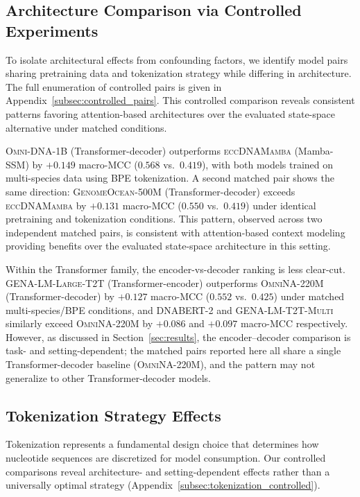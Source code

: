 \documentclass{llmxive}
\begin{document}

\subsection{Architecture Comparison via Controlled Experiments}
\label{subsec:architecture}

To isolate architectural effects from confounding factors, we identify
model pairs sharing pretraining data and tokenization strategy while
differing in architecture. The full enumeration of controlled pairs
is given in Appendix~\ref{subsec:controlled_pairs}. This controlled
comparison reveals consistent patterns favoring attention-based
architectures over the evaluated state-space alternative under matched
conditions.

\textsc{Omni-DNA-1B} (Transformer-decoder) outperforms
\textsc{eccDNAMamba} (Mamba-SSM) by $+0.149$ macro-MCC
($0.568$ vs.\ $0.419$), with both models trained on multi-species
data using BPE tokenization. A second matched pair shows the same
direction: \textsc{GenomeOcean-500M} (Transformer-decoder) exceeds
\textsc{eccDNAMamba} by $+0.131$ macro-MCC ($0.550$ vs.\ $0.419$)
under identical pretraining and tokenization conditions. This pattern,
observed across two independent matched pairs, is consistent with
attention-based context modeling providing benefits over the evaluated
state-space architecture in this setting.

Within the Transformer family, the encoder-vs-decoder ranking is less
clear-cut. \textsc{GENA-LM-Large-T2T} (Transformer-encoder) outperforms
\textsc{OmniNA-220M} (Transformer-decoder) by $+0.127$ macro-MCC
($0.552$ vs.\ $0.425$) under matched multi-species/BPE conditions, and
\textsc{DNABERT-2} and \textsc{GENA-LM-T2T-Multi} similarly exceed
\textsc{OmniNA-220M} by $+0.086$ and $+0.097$ macro-MCC respectively.
However, as discussed in Section~\ref{sec:results}, the encoder--decoder
comparison is task- and setting-dependent; the matched pairs reported
here all share a single Transformer-decoder baseline
(\textsc{OmniNA-220M}), and the pattern may not generalize to other
Transformer-decoder models.

\subsection{Tokenization Strategy Effects}
\label{subsec:tokenization-app}

Tokenization represents a fundamental design choice that determines
how nucleotide sequences are discretized for model consumption. Our
controlled comparisons reveal architecture- and setting-dependent
effects rather than a universally optimal strategy
(Appendix~\ref{subsec:tokenization_controlled}).
\end{document}
